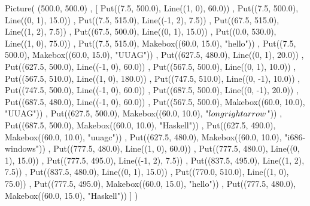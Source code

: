 Picture(
  (500.0, 500.0)
, [ Put((7.5, 500.0), Line((1, 0), 60.0))
  , Put((7.5, 500.0), Line((0, 1), 15.0))
  , Put((7.5, 515.0), Line((-1, 2), 7.5))
  , Put((67.5, 515.0), Line((1, 2), 7.5))
  , Put((67.5, 500.0), Line((0, 1), 15.0))
  , Put((0.0, 530.0), Line((1, 0), 75.0))
  , Put((7.5, 515.0), Makebox((60.0, 15.0), "hello"))
  , Put((7.5, 500.0), Makebox((60.0, 15.0), "UUAG"))
  , Put((627.5, 480.0), Line((0, 1), 20.0))
  , Put((627.5, 500.0), Line((-1, 0), 60.0))
  , Put((567.5, 500.0), Line((0, 1), 10.0))
  , Put((567.5, 510.0), Line((1, 0), 180.0))
  , Put((747.5, 510.0), Line((0, -1), 10.0))
  , Put((747.5, 500.0), Line((-1, 0), 60.0))
  , Put((687.5, 500.0), Line((0, -1), 20.0))
  , Put((687.5, 480.0), Line((-1, 0), 60.0))
  , Put((567.5, 500.0), Makebox((60.0, 10.0), "UUAG"))
  , Put((627.5, 500.0), Makebox((60.0, 10.0), "$\\longrightarrow$"))
  , Put((687.5, 500.0), Makebox((60.0, 10.0), "Haskell"))
  , Put((627.5, 490.0), Makebox((60.0, 10.0), "uuagc"))
  , Put((627.5, 480.0), Makebox((60.0, 10.0), "i686-windows"))
  , Put((777.5, 480.0), Line((1, 0), 60.0))
  , Put((777.5, 480.0), Line((0, 1), 15.0))
  , Put((777.5, 495.0), Line((-1, 2), 7.5))
  , Put((837.5, 495.0), Line((1, 2), 7.5))
  , Put((837.5, 480.0), Line((0, 1), 15.0))
  , Put((770.0, 510.0), Line((1, 0), 75.0))
  , Put((777.5, 495.0), Makebox((60.0, 15.0), "hello"))
  , Put((777.5, 480.0), Makebox((60.0, 15.0), "Haskell"))
  ]
)
